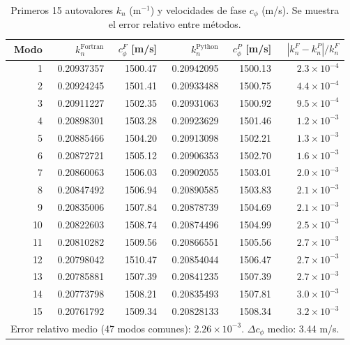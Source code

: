 \documentclass[12pt,a4paper]{article}
\begin{document}
\begin{table}[H]
\centering
\caption{Primeros 15 autovalores $k_n$ (m$^{-1}$) y velocidades de fase
         $c_{\phi}$ (m/s). Se muestra el error relativo entre métodos.}
\label{tab:eigenvalores}
\begin{tabular}{rrrrrr}
\toprule
Modo &
$k_n^{\text{Fortran}}$ &
$c_\phi^F$ [m/s] &
$k_n^{\text{Python}}$ &
$c_\phi^P$ [m/s] &
$|k_n^F - k_n^P|/k_n^F$ \\
\midrule
  1 & 0.20937357 & 1500.47 & 0.20942095 & 1500.13 & $2.3\times10^{-4}$ \\
  2 & 0.20924245 & 1501.41 & 0.20933488 & 1500.75 & $4.4\times10^{-4}$ \\
  3 & 0.20911227 & 1502.35 & 0.20931063 & 1500.92 & $9.5\times10^{-4}$ \\
  4 & 0.20898301 & 1503.28 & 0.20923629 & 1501.46 & $1.2\times10^{-3}$ \\
  5 & 0.20885466 & 1504.20 & 0.20913098 & 1502.21 & $1.3\times10^{-3}$ \\
  6 & 0.20872721 & 1505.12 & 0.20906353 & 1502.70 & $1.6\times10^{-3}$ \\
  7 & 0.20860063 & 1506.03 & 0.20902055 & 1503.01 & $2.0\times10^{-3}$ \\
  8 & 0.20847492 & 1506.94 & 0.20890585 & 1503.83 & $2.1\times10^{-3}$ \\
  9 & 0.20835006 & 1507.84 & 0.20878739 & 1504.69 & $2.1\times10^{-3}$ \\
 10 & 0.20822603 & 1508.74 & 0.20874496 & 1504.99 & $2.5\times10^{-3}$ \\
 11 & 0.20810282 & 1509.56 & 0.20866551 & 1505.56 & $2.7\times10^{-3}$ \\
 12 & 0.20798042 & 1510.47 & 0.20854044 & 1506.47 & $2.7\times10^{-3}$ \\
 13 & 0.20785881 & 1507.39 & 0.20841235 & 1507.39 & $2.7\times10^{-3}$ \\
 14 & 0.20773798 & 1508.21 & 0.20835493 & 1507.81 & $3.0\times10^{-3}$ \\
 15 & 0.20761792 & 1509.34 & 0.20828133 & 1508.34 & $3.2\times10^{-3}$ \\
\bottomrule
\multicolumn{6}{l}{\small
  Error relativo medio (47 modos comunes): $2.26\times10^{-3}$.
  $\Delta c_\phi$ medio: 3.44 m/s.}
\end{tabular}
\end{table}
\end{document}
